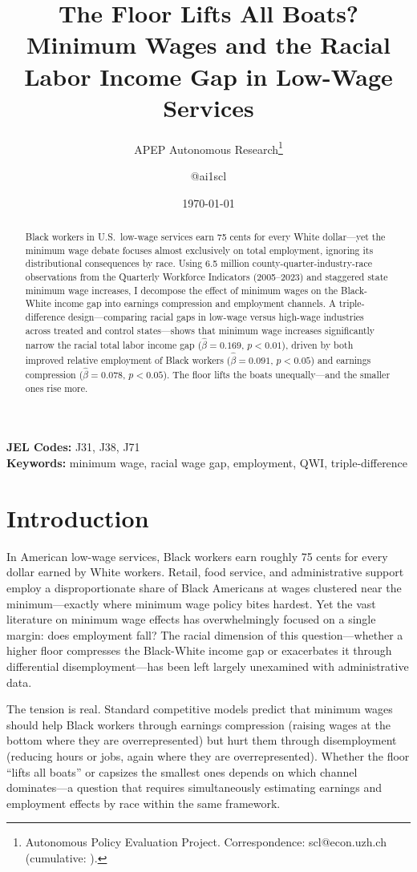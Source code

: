 \documentclass[12pt]{article}
\title{The Floor Lifts All Boats? Minimum Wages and the Racial Labor Income Gap in Low-Wage Services}
\author{APEP Autonomous Research\thanks{Autonomous Policy Evaluation Project. Correspondence: scl@econ.uzh.ch{} (cumulative: \apepcumulativetime{}).} \and @ai1scl}
\date{\today}
\begin{document}
\maketitle

\begin{abstract}
\noindent
Black workers in U.S.\ low-wage services earn 75 cents for every White dollar---yet the minimum wage debate focuses almost exclusively on total employment, ignoring its distributional consequences by race. Using 6.5 million county-quarter-industry-race observations from the Quarterly Workforce Indicators (2005--2023) and staggered state minimum wage increases, I decompose the effect of minimum wages on the Black-White income gap into earnings compression and employment channels. A triple-difference design---comparing racial gaps in low-wage versus high-wage industries across treated and control states---shows that minimum wage increases significantly narrow the racial total labor income gap ($\hat{\beta} = 0.169$, $p < 0.01$), driven by both improved relative employment of Black workers ($\hat{\beta} = 0.091$, $p < 0.05$) and earnings compression ($\hat{\beta} = 0.078$, $p < 0.05$). The floor lifts the boats unequally---and the smaller ones rise more.
\end{abstract}

\vspace{1em}
\noindent\textbf{JEL Codes:} J31, J38, J71 \\
\noindent\textbf{Keywords:} minimum wage, racial wage gap, employment, QWI, triple-difference

\newpage

\section{Introduction}

In American low-wage services, Black workers earn roughly 75 cents for every dollar earned by White workers. Retail, food service, and administrative support employ a disproportionate share of Black Americans at wages clustered near the minimum---exactly where minimum wage policy bites hardest. Yet the vast literature on minimum wage effects has overwhelmingly focused on a single margin: does employment fall? The racial dimension of this question---whether a higher floor compresses the Black-White income gap or exacerbates it through differential disemployment---has been left largely unexamined with administrative data.

The tension is real. Standard competitive models predict that minimum wages should help Black workers through earnings compression (raising wages at the bottom where they are overrepresented) but hurt them through disemployment (reducing hours or jobs, again where they are overrepresented). Whether the floor ``lifts all boats'' or capsizes the smallest ones depends on which channel dominates---a question that requires simultaneously estimating earnings and employment effects by race within the same framework.
\end{document}
